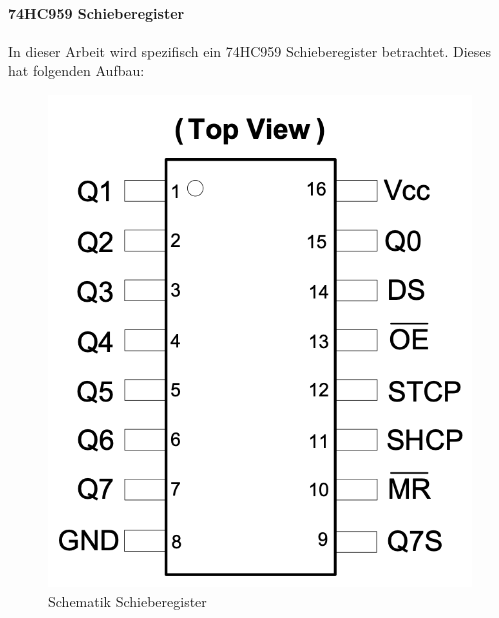 \paragraph{74HC959 Schieberegister}
In dieser Arbeit wird spezifisch ein 74HC959 Schieberegister betrachtet.
Dieses hat folgenden Aufbau:
\begin{figure}[htbp]
\begin{minipage}{0.4\textwidth}

		\includegraphics [width=1\textwidth] {img/Schieberegister}
		\caption{Schematik Schieberegister}
		\label{img:Shift}


\end{minipage}
\end{figure}
